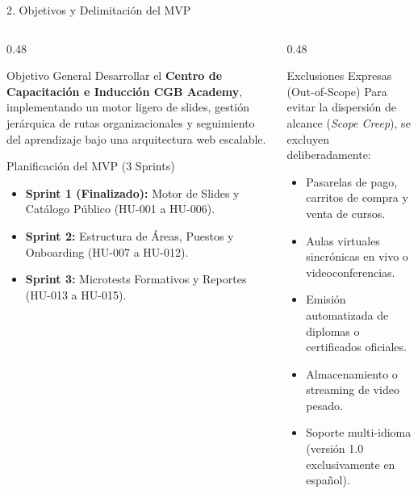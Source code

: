 \documentclass[aspectratio=169, 10pt, spanish]{beamer}
\begin{document}
\begin{frame}{2. Objetivos y Delimitación del MVP}
\begin{columns}[T]
    \begin{column}{0.48\textwidth}
        \begin{academicbox}{Objetivo General}
            \scriptsize
            Desarrollar el \textbf{Centro de Capacitación e Inducción CGB Academy}, implementando un motor ligero de slides, gestión jerárquica de rutas organizacionales y seguimiento del aprendizaje bajo una arquitectura web escalable.
        \end{academicbox}
        \vspace{1.5mm}
        \begin{formalbox}{Planificación del MVP (3 Sprints)}
            \scriptsize
            \begin{itemize}
                \item \textbf{Sprint 1 (Finalizado):} Motor de Slides y Catálogo Público (HU-001 a HU-006).
                \item \textbf{Sprint 2:} Estructura de Áreas, Puestos y Onboarding (HU-007 a HU-012).
                \item \textbf{Sprint 3:} Microtests Formativos y Reportes (HU-013 a HU-015).
            \end{itemize}
        \end{formalbox}
    \end{column}
    \begin{column}{0.48\textwidth}
        \begin{formalbox}{Exclusiones Expresas (Out-of-Scope)}
            \scriptsize
            Para evitar la dispersión de alcance (\textit{Scope Creep}), se excluyen deliberadamente:
            \begin{itemize}
                \item Pasarelas de pago, carritos de compra y venta de cursos.
                \item Aulas virtuales sincrónicas en vivo o videoconferencias.
                \item Emisión automatizada de diplomas o certificados oficiales.
                \item Almacenamiento o streaming de video pesado.
                \item Soporte multi-idioma (versión 1.0 exclusivamente en español).
            \end{itemize}
        \end{formalbox}
    \end{column}
\end{columns}
\end{frame}
\end{document}
